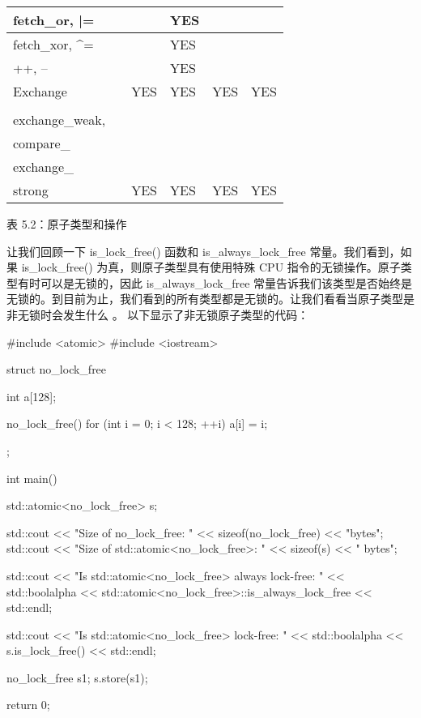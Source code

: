 \begin{longtable}{|l|l|l|l|l|l|}
fetch\_or, |=                                                                                         &     &     & YES &     &     \\ \hline
fetch\_xor, \textasciicircum{}=                                                                       &     &     & YES &     &     \\ \hline
++, --                                                                                                &     &     & YES &     &     \\ \hline
Exchange                                                                                              &     & YES & YES & YES & YES \\ \hline
\begin{tabular}[c]{@{}l@{}}compare\_\\ exchange\_weak,\\ compare\_\\ exchange\_\\ strong\end{tabular} &     & YES & YES & YES & YES \\ \hline
\end{longtable}

\begin{center}
表 5.2：原子类型和操作
\end{center}

让我们回顾一下 is\_lock\_free() 函数和 is\_always\_lock\_free 常量。我们看到，如果 is\_lock\_free() 为真，则原子类型具有使用特殊 CPU 指令的无锁操作。原子类型有时可以是无锁的，因此 is\_always\_lock\_free 常量告诉我们该类型是否始终是无锁的。到目前为止，我们看到的所有类型都是无锁的。让我们看看当原子类型是非无锁时会发生什么
。
以下显示了非无锁原子类型的代码：

\begin{cpp}
#include <atomic>
#include <iostream>

struct no_lock_free {
    int a[128];

    no_lock_free() {
        for (int i = 0; i < 128; ++i) {
            a[i] = i;
        }
    }
};

int main() {
    std::atomic<no_lock_free> s;

    std::cout << "Size of no_lock_free: " << sizeof(no_lock_free) << "bytes\n";
    std::cout << "Size of std::atomic<no_lock_free>: " << sizeof(s) <<
    " bytes\n";

    std::cout << "Is std::atomic<no_lock_free> always lock-free: " <<
    std::boolalpha << std::atomic<no_lock_free>::is_always_lock_free <<
    std::endl;

    std::cout << "Is std::atomic<no_lock_free> lock-free: " <<
    std::boolalpha << s.is_lock_free() << std::endl;

    no_lock_free s1;
    s.store(s1);

    return 0;
}
\end{cpp}


